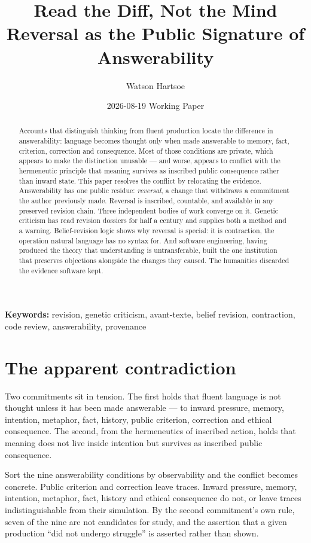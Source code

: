 \documentclass[11pt,a4paper]{article}
\title{\textbf{Read the Diff, Not the Mind}\\[.35em]\large Reversal as the Public Signature of Answerability}
\author{Watson Hartsoe}
\date{2026-08-19 \quad\textemdash\quad Working Paper}
\begin{document}
\maketitle
\begin{abstract}\noindent Accounts that distinguish thinking from fluent production locate the difference in answerability: language becomes thought only when made answerable to memory, fact, criterion, correction and consequence. Most of those conditions are private, which appears to make the distinction unusable --- and worse, appears to conflict with the hermeneutic principle that meaning survives as inscribed public consequence rather than inward state. This paper resolves the conflict by relocating the evidence. Answerability has one public residue: \emph{reversal}, a change that withdraws a commitment the author previously made. Reversal is inscribed, countable, and available in any preserved revision chain. Three independent bodies of work converge on it. Genetic criticism has read revision dossiers for half a century and supplies both a method and a warning. Belief-revision logic shows why reversal is special: it is contraction, the operation natural language has no syntax for. And software engineering, having produced the theory that understanding is untransferable, built the one institution that preserves objections alongside the changes they caused. The humanities discarded the evidence software kept.\end{abstract}
\vspace{-.5em}\noindent\textbf{Keywords:} revision, genetic criticism, avant-texte, belief revision, contraction, code review, answerability, provenance\par\vspace{1em}
\section{The apparent contradiction}
Two commitments sit in tension. The first holds that fluent language is not thought unless it has been made answerable --- to inward pressure, memory, intention, metaphor, fact, history, public criterion, correction and ethical consequence. The second, from the hermeneutics of inscribed action, holds that meaning does not live inside intention but survives as inscribed public consequence.

Sort the nine answerability conditions by observability and the conflict becomes concrete. Public criterion and correction leave traces. Inward pressure, memory, intention, metaphor, fact, history and ethical consequence do not, or leave traces indistinguishable from their simulation. By the second commitment's own rule, seven of the nine are not candidates for study, and the assertion that a given production ``did not undergo struggle'' is asserted rather than shown.
\end{document}
